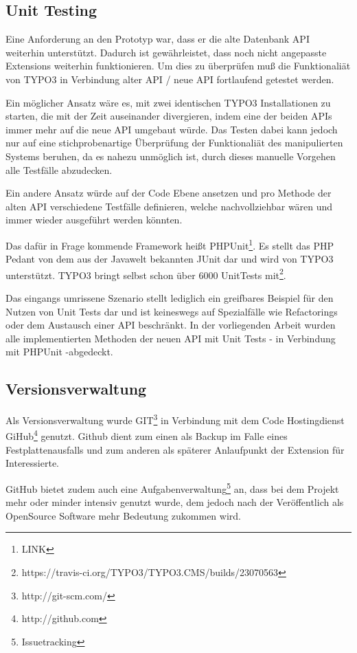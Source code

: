 \subsection{Unit Testing}
Eine Anforderung an den Prototyp war, dass er die alte Datenbank API weiterhin unterstützt. Dadurch ist gewährleistet, dass noch nicht angepasste Extensions weiterhin funktionieren. Um dies zu überprüfen muß die Funktionaliät von TYPO3 in Verbindung alter API / neue API fortlaufend getestet werden.

Ein möglicher Ansatz wäre es, mit zwei identischen TYPO3 Installationen zu starten, die mit der Zeit auseinander divergieren, indem eine der beiden APIs immer mehr auf die neue API umgebaut würde. Das Testen dabei kann jedoch nur auf eine stichprobenartige Überprüfung der Funktionaliät des manipulierten Systems beruhen, da es nahezu unmöglich ist, durch dieses manuelle Vorgehen alle Testfälle abzudecken.

Ein andere Ansatz würde auf der Code Ebene ansetzen und pro Methode der alten API verschiedene Testfälle definieren, welche nachvollziehbar wären und immer wieder ausgeführt werden könnten.

Das dafür in Frage kommende Framework heißt PHPUnit\footnote{LINK}. Es stellt das PHP Pedant von dem aus der Javawelt bekannten JUnit dar und wird von TYPO3 unterstützt. TYPO3 bringt selbst schon über 6000 UnitTests mit\footnote{https://travis-ci.org/TYPO3/TYPO3.CMS/builds/23070563}.

Das eingangs umrissene Szenario stellt lediglich ein greifbares Beispiel für den Nutzen von Unit Tests dar und ist keineswegs auf Spezialfälle wie Refactorings oder dem Austausch einer API beschränkt. In der vorliegenden Arbeit wurden alle implementierten Methoden der neuen API mit Unit Tests - in Verbindung mit PHPUnit -abgedeckt.

\subsection{Versionsverwaltung}
Als Versionsverwaltung wurde GIT\footnote{http://git-scm.com/} in Verbindung mit dem Code Hostingdienst GiHub\footnote{http://github.com} genutzt. Github dient zum einen als Backup im Falle eines Festplattenausfalls und zum anderen als späterer Anlaufpunkt der Extension für Interessierte.

GitHub bietet zudem auch eine Aufgabenverwaltung\footnote{Issuetracking} an, dass bei dem Projekt mehr oder minder intensiv genutzt wurde, dem jedoch nach der Veröffentlich als OpenSource Software mehr Bedeutung zukommen wird.

